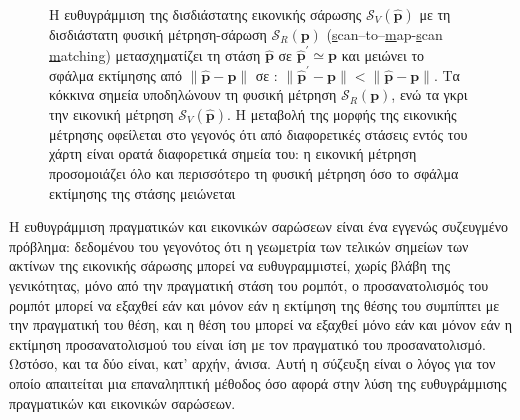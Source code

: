 \begin{figure}[htbp]\centering
  
  \vspace{0.5cm}
  \caption{\small Η ευθυγράμμιση της δισδιάστατης εικονικής σάρωσης
           $\mathcal{S}_V(\hat{\bm{p}})$ με τη δισδιάστατη φυσική μέτρηση-σάρωση
           $\mathcal{S}_R(\bm{p})$
           (\underline{s}can--to--\underline{m}ap-\underline{s}can
           \underline{m}atching) μετασχηματίζει τη στάση $\hat{\bm{p}}$ σε
           $\hat{\bm{p}}^\prime \simeq \bm{p}$ και μειώνει το σφάλμα εκτίμησης
           από $\|\hat{\bm{p}}-\bm{p}\|$ σε : $\|\hat{\bm{p}}^\prime -
           \bm{p}\| < \|\hat{\bm{p}}- \bm{p}\|$. Τα κόκκινα σημεία υποδηλώνουν
           τη φυσική μέτρηση $\mathcal{S}_R(\bm{p})$, ενώ τα γκρι την εικονική
           μέτρηση $\mathcal{S}_V(\hat{\bm{p}})$.  Η μεταβολή της μορφής της
           εικονικής μέτρησης οφείλεται στο γεγονός ότι από διαφορετικές
           στάσεις εντός του χάρτη είναι ορατά διαφορετικά σημεία του: η
           εικονική μέτρηση προσομοιάζει όλο και περισσότερο τη φυσική μέτρηση
           όσο το σφάλμα εκτίμησης της στάσης μειώνεται}
  \label{fig:smsm_principle}
\end{figure}

\begin{gg_box}
\begin{remark}
\label{rem:iterative}
Η ευθυγράμμιση πραγματικών και εικονικών σαρώσεων είναι ένα εγγενώς συζευγμένο
πρόβλημα: δεδομένου του γεγονότος ότι η γεωμετρία των τελικών σημείων των
ακτίνων της εικονικής σάρωσης μπορεί να ευθυγραμμιστεί, χωρίς βλάβη της
γενικότητας, μόνο από την πραγματική στάση του ρομπότ, ο προσανατολισμός του
ρομπότ μπορεί να εξαχθεί εάν και μόνον εάν η εκτίμηση της θέσης του συμπίπτει
με την πραγματική του θέση, και η θέση του μπορεί να εξαχθεί μόνο εάν και
μόνον εάν η εκτίμηση προσανατολισμού του είναι ίση με τον πραγματικό του
προσανατολισμό. Ωστόσο, και τα δύο είναι, κατ' αρχήν, άνισα. Αυτή η σύζευξη
είναι ο λόγος για τον οποίο απαιτείται μια επαναληπτική μέθοδος όσο αφορά
στην λύση της ευθυγράμμισης πραγματικών και εικονικών σαρώσεων.
\end{remark}
\end{gg_box}

